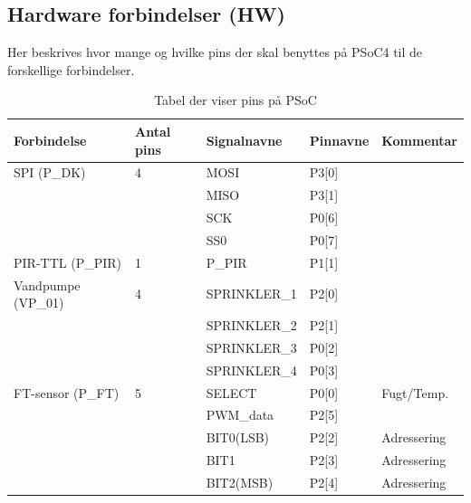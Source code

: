 
\begin{table}[H]
\subsection{Hardware forbindelser (HW)}
Her beskrives hvor mange og hvilke pins der skal benyttes på PSoC4 til de forskellige forbindelser.
\caption{Tabel der viser pins på PSoC}
\begin{small}
\begin{tabular}{|p{}|p{2cm}|p{}|p{}|p{2.6cm}|}
\hline

\textbf{Forbindelse}	&\textbf{Antal pins} 	&\textbf{Signalnavne} &\textbf{Pinnavne} &\textbf{Kommentar}  \\ \hline

SPI 	(P\_DK)			&4 						&MOSI				&P3[0]		&					\\\cline{3-4}
					&						&MISO				&P3[1]		&					\\\cline{3-4}
					&						&SCK					&P0[6]		&					\\\cline{3-4}
					&						&SS0					&P0[7]		&					\\\hline
	
PIR-TTL	(P\_PIR)		&1 						&P\_PIR				&P1[1] 		&					\\\hline

Vandpumpe (VP\_01)	&4 						&SPRINKLER\_1		&P2[0]		&					\\\cline{3-4}
					&						&SPRINKLER\_2		&P2[1]		&					\\\cline{3-4}
					&						&SPRINKLER\_3		&P0[2]		&					\\\cline{3-4}
					&						&SPRINKLER\_4		&P0[3]		&					\\\hline
		
FT-sensor (P\_FT)	&5						&SELECT				&P0[0]		&Fugt/Temp.			\\\cline{3-5}
					&						&PWM\_data			&P2[5]		&					\\\cline{3-5}
					&						&BIT0(LSB)			&P2[2]		&Adressering			\\\cline{3-5}
					&						&BIT1				&P2[3]		&Adressering			\\\cline{3-5}
					&						&BIT2(MSB)			&P2[4]		&Adressering			\\\hline			
					

\end{tabular}
\end{small}
\end{table}
